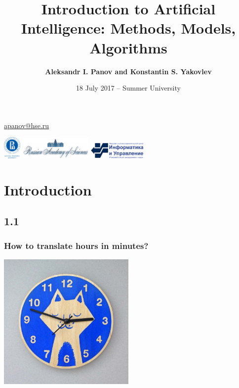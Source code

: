 \documentclass[default]{beamer}
\begin{document}
	
	\title[Introduction to AI]{Introduction to Artificial Intelligence: Methods, Models, Algorithms}
	\author[Panov]{\textbf{Aleksandr I. Panov and Konstantin S. Yakovlev}}
	\date{18 July 2017 -- Summer University} 
	
	{
	\begin{frame}
		
		\titlepage
		\centering
		\href{mailto:apanov@hse.ru}{apanov@hse.ru}
		
		\includegraphics[width=25pt]{hse.png} \hspace{10pt}
		\includegraphics[width=100pt]{ras_en.png} \hspace{10pt}
		\includegraphics[width=80pt]{frccsc.png}
		
	\end{frame}
	}	

	\section{Introduction}
	\subsection{1.1}
	\begin{frame}
		\frametitle{How to translate hours in minutes?}

		\centering
		\includegraphics[width=0.5\textwidth]{intro1.jpg}
	\end{frame}
\end{document}
